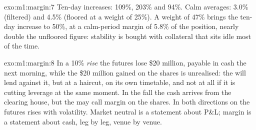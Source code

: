 \begin{solution}{exo:m1:margin:7}
Ten-day increases: 109\%, 203\% and 94\%. Calm averages: 3.0\% (filtered) and
4.5\% (floored at a weight of 25\%). A weight of 47\% brings the ten-day
increase to 50\%, at a calm-period margin of 5.8\% of the position, nearly
double the unfloored figure: stability is bought with collateral that sits
idle most of the time.
\end{solution}

\begin{solution}{exo:m1:margin:8}
In a 10\% \emph{rise} the futures lose \$20 million, payable in cash the next
morning, while the \$20 million gained on the shares is unrealised: the  will lend against it, but at a haircut, on its own timetable, and not
at all if it is cutting leverage at the same moment. In the fall the cash
arrives from the clearing house, but the  may call margin on the
shares. In both directions  on the futures rises with
volatility. Market neutral is a statement about P\&L; margin is a statement
about cash, leg by leg, venue by venue.
\end{solution}

